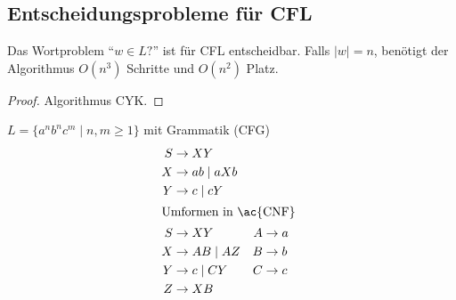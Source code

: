 \subsection{Entscheidungsprobleme für \acs*{CFL}}
\begin{Satz}[name={[Wortproblem für \acs*{CFL} entscheidbar]}]
	Das Wortproblem "`$w\in L?$"' ist für \ac{CFL} entscheidbar. Falls $|w|=n$, benötigt der Algorithmus $O(n^3)$ Schritte und $O(n^2)$ Platz.
\end{Satz}
\begin{proof}
	Algorithmus \ac{CYK}.
\end{proof}
\begin{Bsp}
	$L=\{a^nb^nc^m \mid n,m\geq 1\}$ mit Grammatik (\acs{CFG})
	\begin{align*}
		S &\-> XY\\
		X &\-> ab \mid aXb\\
		Y &\-> c \mid cY\\
		\shortintertext{Umformen in \ac{CNF}}
		S &\-> XY & A &\->a\\
		X &\-> AB \mid AZ & B&\->b\\
		Y &\->c \mid CY & C &\->c\\
		Z &\-> XB
	\end{align*}
\end{Bsp}


